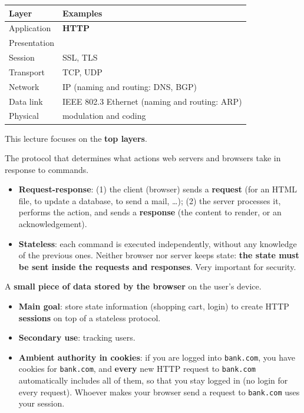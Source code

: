 \begin{defnbox}[title={Where we are: the top layers of the Internet (OSI model)}]
\begin{center}
\small
\begin{tabular}{l|l}
\textbf{Layer} & \textbf{Examples} \\ \hline
Application  & \textbf{HTTP} \\
Presentation & \\
Session      & SSL, TLS \\
Transport    & TCP, UDP \\
Network      & IP (naming and routing: DNS, BGP) \\
Data link    & IEEE 802.3 Ethernet (naming and routing: ARP) \\
Physical     & modulation and coding
\end{tabular}
\end{center}
This lecture focuses on the \textbf{top layers}.
\end{defnbox}

\begin{defnbox}[title={HTTP/1.1: HyperText Transfer Protocol}]
The protocol that determines what actions web servers and browsers take in response to commands.
\begin{itemize}
  \item \textbf{Request-response}: (1) the client (browser) sends a \textbf{request} (for an HTML
        file, to update a database, to send a mail, \ldots); (2) the server processes it, performs
        the action, and sends a \textbf{response} (the content to render, or an acknowledgement).
  \item \textbf{Stateless}: each command is executed independently, without any knowledge of the
        previous ones. Neither browser nor server keeps state: \textbf{the state must be sent
        inside the requests and responses}. Very important for security.
\end{itemize}
\end{defnbox}

\begin{defnbox}[title=Cookies]
A \textbf{small piece of data stored by the browser} on the user's device.
\begin{itemize}
  \item \textbf{Main goal}: store state information (shopping cart, login) to create HTTP
        \textbf{sessions} on top of a stateless protocol.
  \item \textbf{Secondary use}: tracking users.
  \item \textbf{Ambient authority in cookies}: if you are logged into \texttt{bank.com}, you have
        cookies for \texttt{bank.com}, and \textbf{every} new HTTP request to \texttt{bank.com}
        automatically includes all of them, so that you stay logged in (no login for every
        request). Whoever makes your browser send a request to \texttt{bank.com} uses your
        session.
\end{itemize}
\end{defnbox}

